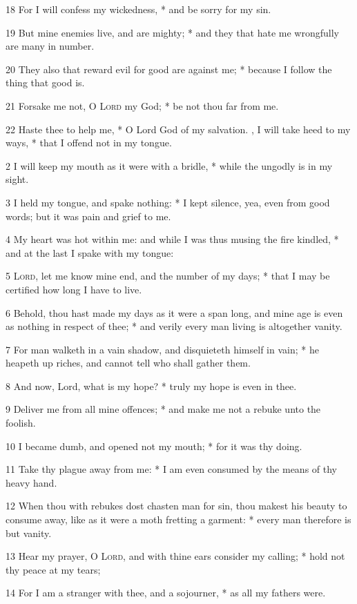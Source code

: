 18 For I will confess my wickedness, * and be sorry for my sin.\par
19 But mine enemies live, and are mighty; * and they that hate me wrongfully are many in number.\par
20 They also that reward evil for good are against me; * because I follow the thing that good is.\par
21 Forsake me not, O {\textsc{Lord}} my God; * be not thou far from me.\par
22 Haste thee to help me, * O Lord God of my salvation.
, I will take heed to my ways, * that I offend not in my tongue.\par
2 I will keep my mouth as it were with a bridle, * while the ungodly is in my sight.\par
3 I held my tongue, and spake nothing: * I kept silence, yea, even from good words; but it was pain and grief to me.\par
4 My heart was hot within me: and while I was thus musing the fire kindled, * and at the last I spake with my tongue:\par
5 {\textsc{Lord}}, let me know mine end, and the number of my days; * that I may be certified how long I have to live.\par
6 Behold, thou hast made my days as it were a span long, and mine age is even as nothing in respect of thee; * and verily every man living is altogether vanity.\par
7 For man walketh in a vain shadow, and disquieteth himself in vain; * he heapeth up riches, and cannot tell who shall gather them.\par
8 And now, Lord, what is my hope? * truly my hope is even in thee.\par
9 Deliver me from all mine offences; * and make me not a rebuke unto the foolish.\par
10 I became dumb, and opened not my mouth; * for it was thy doing.\par
11 Take thy plague away from me: * I am even consumed by the means of thy heavy hand.\par
12 When thou with rebukes dost chasten man for sin, thou makest his beauty to consume away, like as it were a moth fretting a garment: * every man therefore is but vanity.\par
13 Hear my prayer, O {\textsc{Lord}}, and with thine ears consider my calling; * hold not thy peace at my tears;\par
14 For I am a stranger with thee, and a sojourner, * as all my fathers were.\par
